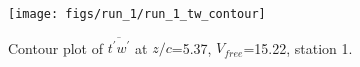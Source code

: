 \begin{figure}[H]
\centering
\texttt{[image: figs/run\_1/run\_1\_tw\_contour]}
\caption{Contour plot of $\overline{t^\prime w^\prime}$ at $z/c$=5.37, $V_{free}$=15.22, station 1.}
\label{fig:run_1_tw_contour}
\end{figure}


